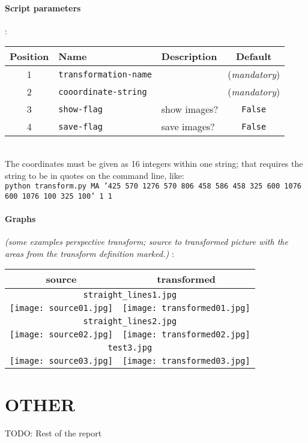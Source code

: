 \documentclass[a4paper]{article}
\begin{document}
\paragraph{Script parameters}
:\\
\small
\begin{tabular}{ |c|l|l|c| }
  \hline
Position & Name & Description & Default \\
  \hline
1 & \texttt{transformation-name} &  & (\textit{mandatory}) \\
2 & \texttt{cooordinate-string} &  & (\textit{mandatory}) \\
3 & \texttt{show-flag} & show images? & \texttt{False} \\
4 & \texttt{save-flag} & save images? & \texttt{False} \\
\hline
\end{tabular}
\normalsize
\\
The coordinates must be given as 16 integers within one string; that requires
the string to be in quotes on the command line, like:\\
\tiny
\texttt{python transform.py MA '425 570 1276 570 806 458 586 458  325 600 1076 600 1076 100 325 100' 1 1}
\normalsize

\paragraph{Graphs}
\textit{(some examples perspective transform; source to transformed picture
with the areas from the transform definition marked.)}
:\\
\begin{tabular}{ |c|c| }
  \hline
  source & transformed \\
  \hline
  \multicolumn{2}{|c|}{\texttt{straight\_lines1.jpg}} \\
  \texttt{[image: source01.jpg]} & \texttt{[image: transformed01.jpg]} \\
  \hline
  \multicolumn{2}{|c|}{\texttt{straight\_lines2.jpg}} \\
  \texttt{[image: source02.jpg]} & \texttt{[image: transformed02.jpg]} \\
  \hline
  \multicolumn{2}{|c|}{\texttt{test3.jpg}} \\
  \texttt{[image: source03.jpg]} & \texttt{[image: transformed03.jpg]} \\
  \hline
\end{tabular}

\section{OTHER}
TODO: Rest of the report
\end{document}
